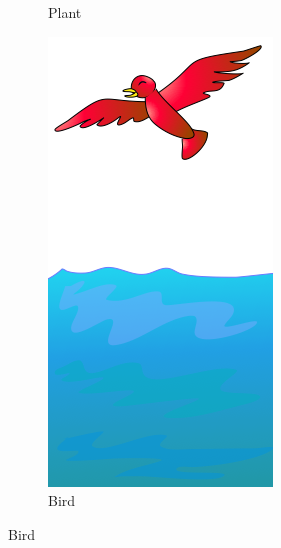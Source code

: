\begin{figure}
\begin{subfigure}[b]{0.3\textwidth}
         \caption{Plant}
      \end{subfigure}
      \begin{subfigure}[b]{0.3\textwidth}
        \includegraphics[width=\textwidth]{ic_bird3.png}
        \caption{Bird}
      \end{subfigure}

\end{figure}
